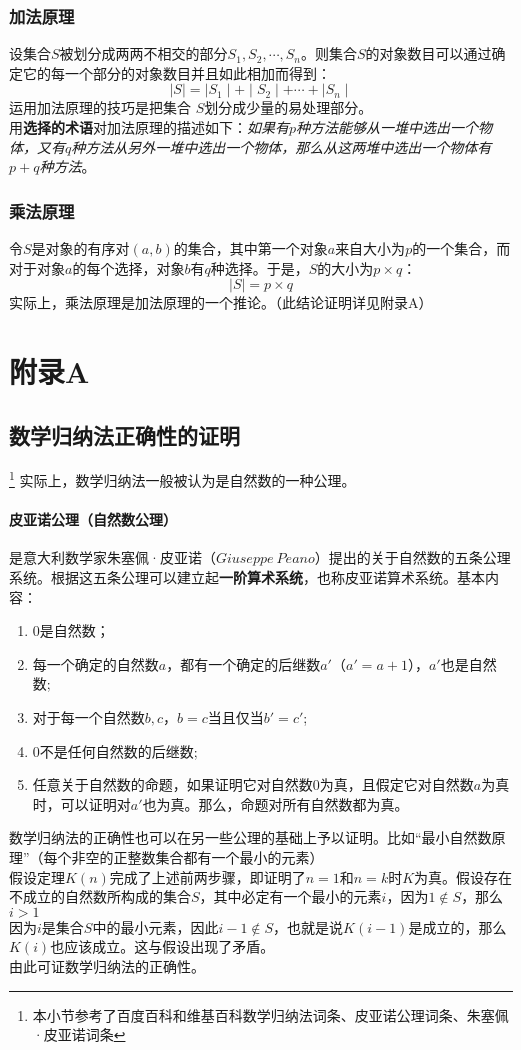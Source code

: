 \documentclass{ctexart}
\begin{document}
    \subsubsection{加法原理}
    设集合$S$被划分成两两不相交的部分$S_1,S_2,\cdots , S_n$。则集合$S$的对象数目可以通过确定它的每一个部分的对象数目并且如此相加而得到：
    \[\mid S \mid = \mid S_1\mid + \mid S_2\mid + \cdots + \mid S_n\mid \]
    运用加法原理的技巧是把集合 $S$划分成少量的易处理部分。\\
    用\textbf{选择的术语}对加法原理的描述如下：\textit{如果有$p$种方法能够从一堆中选出一个物体，又有$q$种方法从另外一堆中选出一个物体，那么从这两堆中选出一个物体有$p+q$种方法}。
    \subsubsection{乘法原理}
    令$S$是对象的有序对$(a,b)$的集合，其中第一个对象$a$来自大小为$p$的一个集合，而对于对象$a$的每个选择，对象$b$有$q$种选择。于是，$S$的大小为$p \times q$：
    \[\mid S \mid = p \times q\]
    实际上，乘法原理是加法原理的一个推论。（此结论证明详见附录A）
    \section{附录A}
    \subsection{数学归纳法正确性的证明}
    \footnote{本小节参考了百度百科和维基百科数学归纳法词条、皮亚诺公理词条、朱塞佩·皮亚诺词条}
    实际上，数学归纳法一般被认为是自然数的一种公理。
    \paragraph{皮亚诺公理（自然数公理）} 是意大利数学家朱塞佩·皮亚诺（$Giuseppe \ Peano$）提出的关于自然数的五条公理系统。根据这五条公理可以建立起\textbf{一阶算术系统}，也称皮亚诺算术系统。基本内容：
    \begin{enumerate}
        \item 0是自然数；
        \item 每一个确定的自然数$a$，都有一个确定的后继数$a'$（$a' = a+1$），$a'$也是自然数;
        \item 对于每一个自然数$b,c$，$b=c$当且仅当$b' = c'$;
        \item 0不是任何自然数的后继数;
        \item 任意关于自然数的命题，如果证明它对自然数$0$为真，且假定它对自然数$a$为真时，可以证明对$a'$也为真。那么，命题对所有自然数都为真。
    \end{enumerate}
    数学归纳法的正确性也可以在另一些公理的基础上予以证明。比如“最小自然数原理”（每个非空的正整数集合都有一个最小的元素）\\
    假设定理$K(n)$完成了上述前两步骤，即证明了$n = 1$和$n = k$时$K$为真。假设存在不成立的自然数所构成的集合$S$，其中必定有一个最小的元素$i$，因为$1 \notin S$，那么$i > 1$\\
    因为$i$是集合$S$中的最小元素，因此$i - 1 \notin S$，也就是说$K(i -1)$是成立的，那么$K(i)$也应该成立。这与假设出现了矛盾。\\
    由此可证数学归纳法的正确性。
\end{document}
